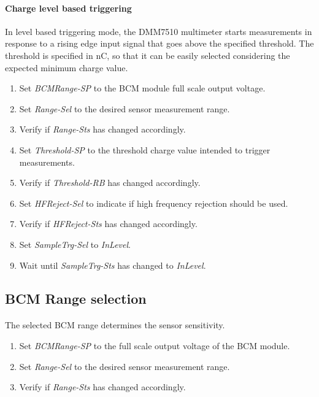 \documentclass[openany]{article}
\begin{document}
		\paragraph{Charge level based triggering} In level based triggering mode, the DMM7510 multimeter starts measurements in response to a rising edge input signal that goes above the specified threshold. The threshold is specified in nC, so that it can be easily selected considering the expected minimum charge value.

			\begin{enumerate}
				\item Set \emph{BCMRange-SP} to the BCM module full scale output voltage.
				\item Set \emph{Range-Sel} to the desired sensor measurement range.
				\item Verify if \emph{Range-Sts} has changed accordingly.
				\item Set \emph{Threshold-SP} to the threshold charge value intended to trigger measurements.
				\item Verify if \emph{Threshold-RB} has changed accordingly.
				\item Set \emph{HFReject-Sel} to indicate if high frequency rejection should be used.
				\item Verify if \emph{HFReject-Sts} has changed accordingly.
				\item Set \emph{SampleTrg-Sel} to \emph{InLevel}.
				\item Wait until \emph{SampleTrg-Sts} has changed to \emph{InLevel}.
			\end{enumerate}

	\subsection{BCM Range selection}

		\paragraph{} The selected BCM range determines the sensor sensitivity.

			\begin{enumerate}
				\item Set \emph{BCMRange-SP} to the full scale output voltage of the BCM module.
				\item Set \emph{Range-Sel} to the desired sensor measurement range.
				\item Verify if \emph{Range-Sts} has changed accordingly.
			\end{enumerate}
\end{document}
